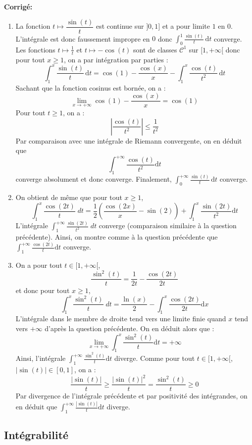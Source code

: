 \documentclass[a4paper,twoside,french,10pt]{VcCours}
\newcommand{\dx}{\text{d}x}
\newcommand{\dt}{\text{d}t}
\newcommand{\corr}{\textbf{Corrigé:}}
\begin{document}
\corr 
\begin{enumerate}
\item La fonction $t\mapsto \dfrac{\sin(t)}{t}$ est continue sur $]0,1]$ et a pour limite $1$ en $0$. L'intégrale est donc faussement impropre en $0$ donc $\int_0^1\frac{\sin(t)}{t}\, \dt$ converge. Les fonctions $t \mapsto \frac{1}{t}$ et $t \mapsto - \cos(t)$ sont de classes $\mathcal{C}^1$ sur $[1, + \infty[$ donc pour tout $x \geq 1$, on a par intégration par parties :
\[\int_1^x\frac{\sin(t)}{t}\, \dt=\cos(1)-\frac{\cos(x)}{x}-\int_1^x\frac{\cos(t)}{t^2}\, \dt\]
Sachant que la fonction cosinus est bornée, on a :
$$ \lim_{x \rightarrow + \infty} \cos(1)-\frac{\cos(x)}{x} = \cos(1)$$
Pour tout $t \geq 1$, on a :
$$ \left\vert \frac{\cos(t)}{t^2} \right\vert \leq \frac{1}{t^2}$$
Par comparaison avec une intégrale de Riemann convergente, on en déduit que 
$$ \int_{1}^{+ \infty} \frac{\cos(t)}{t^2} \dt$$
converge absolument et donc converge. Finalement, $\int_0^{+ \infty} \frac{\sin(t)}{t}\, \dt$ converge.  
\item On obtient de m\^eme  que pour tout $x \geq 1$,
\[\int_1^x\frac{\cos(2t)}{t}\;dt=\frac{1}{2}\left (\frac{\cos(2x)}{x}-\sin(2)\right )+\int_1^x\frac{\sin(2t)}{t^2}\dt\]
L'intégrale $\int_1^{+ \infty} \frac{\sin(2t)}{t^2}\;dt$ converge (comparaison similaire à la question précédente). Ainsi, on montre comme \`a la question précédente que $\int_1^{+\infty}\frac{\cos(2t)}{t}\dt$ converge.
\item On a pour tout $t \in [1, + \infty[$,
$$\frac{\sin^2(t)}{t}=\frac{1}{2t}-\frac{\cos(2t)}{2t}$$
 et donc pour tout $x \geq 1$,
\[\int_1^x\frac{\sin^2(t)}{t}\;dt=\frac{\ln(x)}{2}-\int_1^x\frac{\cos(2t)}{2t}\dx\]
L'intégrale dans le membre de droite tend vers une limite finie quand $x$ tend vers $+ \infty$ d'après la question précédente. On en déduit alors que :
$$ \lim_{x \rightarrow + \infty} \int_1^x\frac{\sin^2(t)}{t}\dt = + \infty$$
 Ainsi, l'intégrale $\int_1^{+\infty}\frac{\sin^2(t)}{t}\dt$ diverge.
Comme pour tout $t \in [1, + \infty[$, $\vert \sin(t) \vert \in [0,1]$, on a :
$$\frac{\vert \sin(t) \vert}{t} \geq \frac{\vert \sin(t)\vert^2}{t} = \frac{\sin^2(t)}{t}\geq0$$
Par divergence de l'intégrale précédente et par positivité des intégrandes, on en déduit que $\int_1^{+\infty}\frac{|\sin(t)|}{t}\dt$ diverge.
\end{enumerate}

\medskip


\subsection{Intégrabilité}
\end{document}
